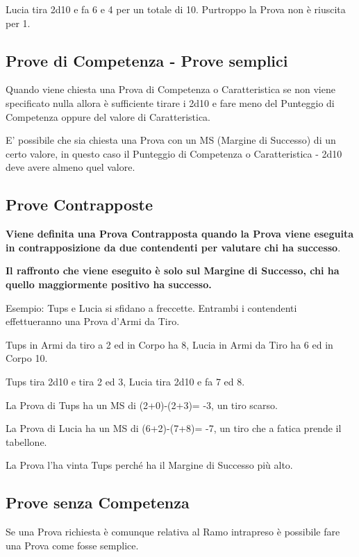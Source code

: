 \documentclass[12pt,a4paper,twoside,openany]{book}
\begin{document}
\begin{multicols}{2}
Lucia tira 2d10 e fa 6 e 4 per un totale di 10. Purtroppo la Prova non è riuscita per 1.

\subsection{Prove di Competenza - Prove semplici}

Quando viene chiesta una Prova di Competenza o Caratteristica se non viene specificato nulla allora è sufficiente tirare i 2d10 e fare meno del Punteggio di Competenza oppure del valore di Caratteristica.

E' possibile che sia chiesta una Prova con un MS (Margine di Successo) di un certo valore, in questo caso il Punteggio di Competenza o Caratteristica - 2d10 deve avere almeno quel valore.

\subsection{Prove Contrapposte}

\textbf{Viene definita una Prova Contrapposta quando la Prova viene eseguita in contrapposizione da due contendenti per valutare chi ha successo}.

\textbf{Il raffronto che viene eseguito è solo sul Margine di Successo, chi ha quello maggiormente positivo ha successo.}

Esempio: Tups e Lucia si sfidano a freccette.
Entrambi i contendenti effettueranno una Prova d'Armi da Tiro.

Tups in Armi da tiro a 2 ed in Corpo ha 8, Lucia in Armi da Tiro ha 6 ed in Corpo 10.

Tups tira 2d10 e tira 2 ed 3, Lucia tira 2d10 e fa 7 ed 8.

La Prova di Tups ha un MS di (2+0)-(2+3)= -3, un tiro scarso.

La Prova di Lucia ha un MS di (6+2)-(7+8)= -7, un tiro che a fatica prende il tabellone.

La Prova l'ha vinta Tups perché ha il Margine di Successo più alto.

\subsection{Prove senza Competenza}

Se una Prova richiesta è comunque relativa al Ramo intrapreso è possibile fare una Prova come fosse semplice.


\end{multicols}
\end{document}
